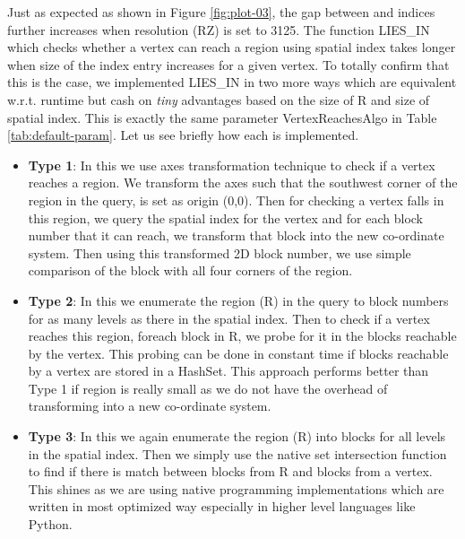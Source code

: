 Just as expected as shown in Figure \ref{fig:plot-03}, the gap between {\rrp} and {\rrpsocial} indices further increases when resolution (RZ) is set to 3125. The function LIES\_IN which checks whether a vertex can reach a region using spatial index takes longer when size of the index entry increases for a given vertex. To totally confirm that this is the case, we implemented LIES\_IN in two more ways which are equivalent w.r.t. runtime but cash on \textit{tiny} advantages based on the size of R and size of spatial index. This is exactly the same parameter VertexReachesAlgo in Table \ref{tab:default-param}. Let us see briefly how each is implemented.
\begin{itemize}
  \item \textbf{Type 1}: In this we use axes transformation technique to check if a vertex reaches a region. We transform the axes such that the southwest corner of the region in the query, is set as origin (0,0). Then for checking a vertex falls in this region, we query the spatial index for the vertex and for each block number that it can reach, we transform that block into the new co-ordinate system. Then using this transformed 2D block number, we use simple comparison of the block with all four corners of the region.
  \item \textbf{Type 2}: In this we enumerate the region (R) in the query to block numbers for as many levels as there in the spatial index. Then to check if a vertex reaches this region, foreach block in R, we probe for it in the blocks reachable by the vertex. This probing can be done in constant time if blocks reachable by a vertex are stored in a HashSet. This approach performs better than Type 1 if region is really small as we do not have the overhead of transforming into a new co-ordinate system.
  \item \textbf{Type 3}: In this we again enumerate the region (R) into blocks for all levels in the spatial index. Then we simply use the native set intersection function to find if there is match between blocks from R and blocks from a vertex. This shines as we are using native programming implementations which are written in most optimized way especially in higher level languages like Python.
\end{itemize}

